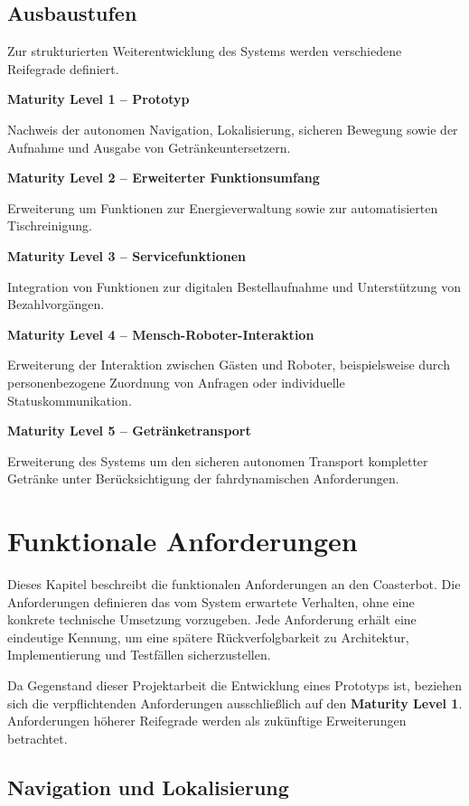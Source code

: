 \documentclass[
  a4paper,
  12pt,
  DIV=12,        %
  parskip=half,  %
  headings=small %
]{scrartcl}
\theoremstyle{definition}
\theoremstyle{definition}
\begin{document}
\subsection{Ausbaustufen}\label{ausbaustufen}

Zur strukturierten Weiterentwicklung des Systems werden verschiedene
Reifegrade definiert.

\textbf{Maturity Level 1 -- Prototyp}

Nachweis der autonomen Navigation, Lokalisierung, sicheren Bewegung
sowie der Aufnahme und Ausgabe von Getränkeuntersetzern.

\textbf{Maturity Level 2 -- Erweiterter Funktionsumfang}

Erweiterung um Funktionen zur Energieverwaltung sowie zur
automatisierten Tischreinigung.

\textbf{Maturity Level 3 -- Servicefunktionen}

Integration von Funktionen zur digitalen Bestellaufnahme und
Unterstützung von Bezahlvorgängen.

\textbf{Maturity Level 4 -- Mensch-Roboter-Interaktion}

Erweiterung der Interaktion zwischen Gästen und Roboter, beispielsweise
durch personenbezogene Zuordnung von Anfragen oder individuelle
Statuskommunikation.

\textbf{Maturity Level 5 -- Getränketransport}

Erweiterung des Systems um den sicheren autonomen Transport kompletter
Getränke unter Berücksichtigung der fahrdynamischen Anforderungen.

\section{Funktionale Anforderungen}\label{funktionale-anforderungen}

Dieses Kapitel beschreibt die funktionalen Anforderungen an den
Coasterbot. Die Anforderungen definieren das vom System erwartete
Verhalten, ohne eine konkrete technische Umsetzung vorzugeben. Jede
Anforderung erhält eine eindeutige Kennung, um eine spätere
Rückverfolgbarkeit zu Architektur, Implementierung und Testfällen
sicherzustellen.

Da Gegenstand dieser Projektarbeit die Entwicklung eines Prototyps ist,
beziehen sich die verpflichtenden Anforderungen ausschließlich auf den
\textbf{Maturity Level 1}. Anforderungen höherer Reifegrade werden als
zukünftige Erweiterungen betrachtet.

\subsection{Navigation und
Lokalisierung}\label{navigation-und-lokalisierung}
\end{document}
